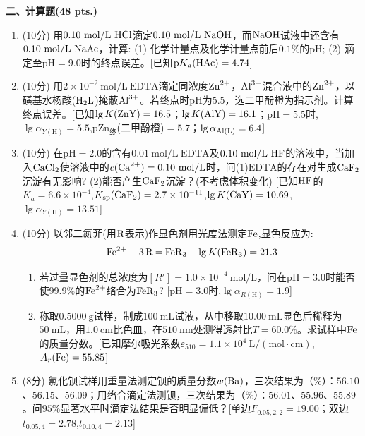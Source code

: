 \vspace{0.5cm}
\noindent\textbf{二、计算题(48 pts.)}

\begin{enumerate}[label=\arabic*., itemsep=1.5ex]
    \item (10分) 用$0.10\ \mathrm{mol/L}\ \ce{HCl}$滴定$0.10\ \mathrm{mol/L}\ \ce{NaOH}$，而$\ce{NaOH}$试液中还含有$0.10\ \mathrm{mol/L}\ \ce{NaAc}$，计算: (1) 化学计量点及化学计量点前后$0.1\%$的$\mathrm{pH}$; (2) 滴定至$\mathrm{pH}=9.0$时的终点误差。[已知$\mathrm{p}K_a(\ce{HAc})=4.74$]
    \item (10分) 用$2\times10^{-2}\ \mathrm{mol/L}\ \mathrm{EDTA}$滴定同浓度$\ce{Zn^{2+}}$，$\ce{Al^{3+}}$混合液中的$\ce{Zn^{2+}}$，以磺基水杨酸($\ce{H2L}$)掩蔽$\ce{Al^{3+}}$。若终点时$\mathrm{pH}$为$5.5$，选二甲酚橙为指示剂。计算终点误差。[已知$\lg K(\ce{ZnY})=16.5$；$\lg K(\ce{AlY})=16.1$；$\mathrm{pH}=5.5$时,$\lg\alpha_{Y(\mathrm{H})}=5.5$,$\mathrm{pZn_{终}}$(二甲酚橙)$=5.7$；$\lg\alpha_{\ce{Al(L)}}=6.4$]
    \item (10分) 在$\mathrm{pH}=2.0$的含有$0.01\ \mathrm{mol/L}\ \mathrm{EDTA}$及$0.10\ \mathrm{mol/L}\ \ce{HF}$的溶液中，当加入$\ce{CaCl2}$使溶液中的$c(\ce{Ca^{2+}})=0.10\ \mathrm{mol/L}$时，问(1)$\mathrm{EDTA}$的存在对生成$\ce{CaF2}$沉淀有无影响? (2)能否产生$\ce{CaF2}$沉淀？(不考虑体积变化) [已知$\ce{HF}$的$K_a=6.6\times10^{-4}$,$K_{\mathrm{sp}}(\ce{CaF2})=2.7\times10^{-11}$,$\lg K(\ce{CaY})=10.69$,$\lg\alpha_{Y(\mathrm{H})}=13.51$]
    \item (10分) 以邻二氮菲(用$\ce{R}$表示)作显色剂用光度法测定$\ce{Fe}$,显色反应为:
    \[
    \ce{Fe^{2+} + 3R = FeR3} \quad \lg K(\ce{FeR3})=21.3
    \]
    \begin{enumerate}[label=(\arabic*), noitemsep, topsep=0pt, partopsep=0pt]
        \item 若过量显色剂的总浓度为$[R']=1.0\times10^{-4}\ \mathrm{mol/L}$，问在$\mathrm{pH}=3.0$时能否使$99.9\%$的$\ce{Fe^{2+}}$络合为$\ce{FeR3}$? [$\mathrm{pH}=3.0$时,$\lg\alpha_{R(\mathrm{H})}=1.9$]
        \item 称取$0.5000\ \mathrm{g}$试样，制成$100\ \mathrm{mL}$试液，从中移取$10.00\ \mathrm{mL}$显色后稀释为$50\ \mathrm{mL}$，用$1.0\ \mathrm{cm}$比色皿，在$510\ \mathrm{nm}$处测得透射比$T=60.0\%$。求试样中$\ce{Fe}$的质量分数。[已知摩尔吸光系数$\varepsilon_{510}=1.1\times10^4\ \mathrm{L/(mol\cdot cm)}$,$A_r(\ce{Fe})=55.85$]
    \end{enumerate}
    \item (8分) 氯化钡试样用重量法测定钡的质量分数$w(\ce{Ba})$，三次结果为（$\%$）：$56.10$、$56.15$、$56.09$；用络合滴定法测钡，三次结果为（$\%$）：$56.01$、$55.96$、$55.89$。问$95\%$显著水平时滴定法结果是否明显偏低？[单边$F_{0.05,2,2}=19.00$；双边$t_{0.05,4}=2.78$,$t_{0.10,4}=2.13$]
\end{enumerate}